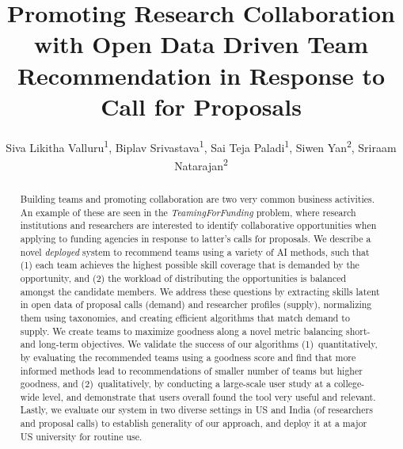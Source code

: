 \documentclass[letterpaper]{article} %
\title{Promoting Research Collaboration with Open Data Driven Team Recommendation in Response to Call for Proposals}
\author {
    Siva Likitha Valluru\textsuperscript{\rm 1},
    Biplav Srivastava\textsuperscript{\rm 1},
    Sai Teja Paladi\textsuperscript{\rm 1},
    Siwen Yan\textsuperscript{\rm 2},
    Sriraam Natarajan\textsuperscript{\rm 2}
}
\begin{document}
\maketitle

\begin{abstract}
Building teams and promoting collaboration 
are two very common business activities. An example of these are seen in the {\em TeamingForFunding} problem, where research institutions and researchers are interested to identify collaborative opportunities when applying to funding agencies in response to latter's calls for proposals. We describe a novel {\em deployed} system to recommend teams using a variety of AI methods, such that (1) each team achieves the highest possible  skill coverage that is demanded by the opportunity, and (2) the workload of distributing the opportunities is balanced amongst the candidate members. We address these questions by extracting skills latent in open data of proposal calls (demand) and researcher profiles (supply), normalizing them using taxonomies, and creating efficient algorithms that match demand to supply. We create teams to maximize goodness along a novel metric balancing short- and long-term objectives. We validate the success of our algorithms (1)~quantitatively, by evaluating the recommended teams using a goodness score and find that more informed methods lead to recommendations of smaller number of teams but higher goodness, and (2)~qualitatively, by conducting a large-scale user study at a college-wide level, and demonstrate that users overall found the tool very useful and relevant. Lastly, we evaluate our system in two diverse settings in US and India (of researchers and proposal calls) to establish generality of our approach, and deploy it at a major US university for routine use.

\end{abstract}











\bigskip


\end{document}
